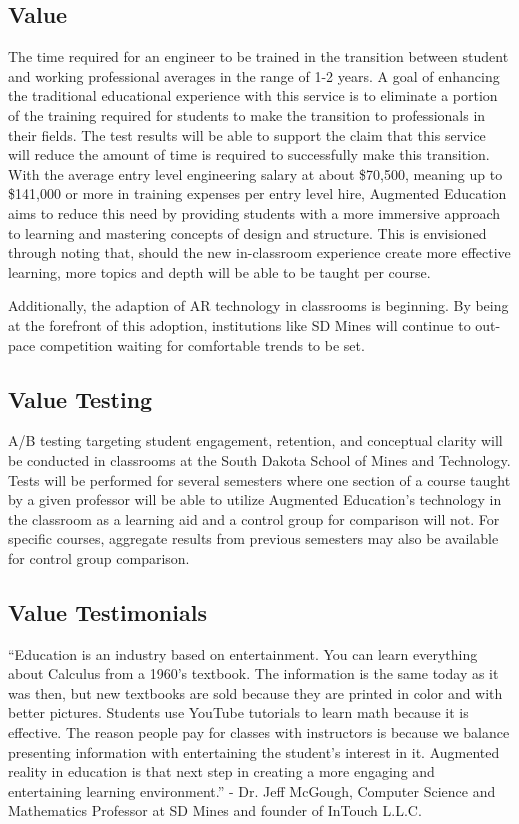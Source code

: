 \subsection{Value} 
The time required for an engineer to be trained in the transition between student and working professional averages in the range of 1-2 years. A goal of enhancing the traditional educational experience with this service is to eliminate a portion of the training required for students to make the transition to professionals in their fields. The test results will be able to support the claim that this service will reduce the amount of time is required to successfully make this transition.  With the average entry level engineering salary at about \$70,500, meaning up to \$141,000 or more in training expenses per entry level hire, Augmented Education aims to reduce this need by providing students with a more immersive approach to learning and mastering concepts of design and structure. This is envisioned through noting that, should the new in-classroom experience create more effective learning, more topics and depth will be able to be taught per course.

Additionally, the adaption of AR technology in classrooms is beginning. By being at the forefront of this adoption, institutions like SD Mines will continue to out-pace competition waiting for comfortable trends to be set. 


\subsection{Value Testing} 
A/B testing targeting student engagement, retention, and conceptual clarity will be conducted in classrooms at the South Dakota School of Mines and Technology. Tests will be performed for several semesters where one section of a course taught by a given professor will be able to utilize Augmented Education's technology in the classroom as a learning aid and a control group for comparison will not. For specific courses, aggregate results from previous semesters may also be available for control group comparison. 

\subsection{Value Testimonials}
“Education is an industry based on entertainment. You can learn everything about Calculus from a 1960’s textbook. The information is the same today as it was then, but new textbooks are sold because they are printed in color and with better pictures. Students use YouTube tutorials to learn math because it is effective. The reason people pay for classes with instructors is because we balance presenting information with entertaining the student’s interest in it. Augmented reality in education is that next step in creating a more engaging and entertaining learning environment.” - Dr. Jeff McGough, Computer Science and Mathematics Professor at SD Mines and founder of InTouch L.L.C.

